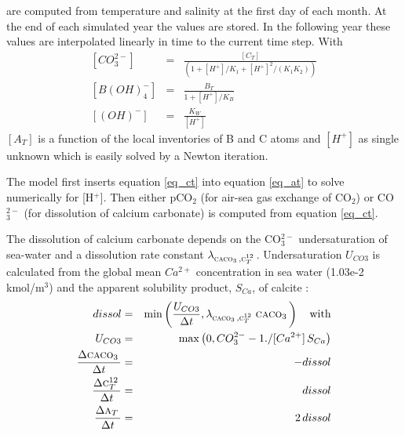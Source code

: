 \documentclass[11pt,a4paper,fleqn,twoside]{article}
\def\car{\text{\textsc{c$_T^{12}$}}\,}
\def\alk{\text{\textsc{a$_T$}}\,}
\def\cal{\text{\textsc{caco$_3$}}\,}
\begin{document}
are computed from temperature and salinity at the first day of  each
month. At the end of each simulated year the values are stored. In the
following year these values are interpolated linearly in time to the 
current time step. 
With
\begin{eqnarray}
\left[CO_3^{2-}\right]& = &\frac{\left[C_T\right]}{(1+\left[H^+\right]/K_1+\left[H^+\right]^2/(K_1K_2))} \\
\left[B(OH)_4^-\right]& = &\frac{B_T}{1+\left[H^+\right]/K_B} \\
\left[(OH)^-\right]& = &\frac{K_W}{\left[H^+\right]}
\end{eqnarray}
$[A_T]$ is a function of the local inventories of B and C atoms and $[H^+]$
as single unknown which is easily solved by a Newton iteration.

The model first inserts equation \ref{eq_ct} into equation \ref{eq_at} to solve
numerically for [H$^+$]. Then either pCO$_2$ (for air-sea gas exchange of
CO$_2$) or CO$_3^{2-}$ (for dissolution of calcium carbonate) is computed from
equation \ref{eq_ct}.

The dissolution of calcium carbonate depends on the CO$_3^{2-}$ undersaturation
of sea-water and a dissolution rate constant $\lambda_{\cal,\car}$.
Undersaturation $U_{CO3}$ is calculated from the global mean $Ca^{2+}$ concentration in sea water
(1.03e-2 kmol/m$^3$) and the apparent solubility product, $S_{Ca}$, of calcite :
\begin{eqnarray}
dissol & = & \min\left(\frac{U_{CO3}}{\Delta t},\lambda_{\cal,\car} \,\cal \right) \quad \mbox{with} \nonumber \\ 
U_{CO3} & = & \max\left(0, CO_3^{2-} - 1./[Ca^{2+}]\,S_{Ca}\right)  \nonumber \\ 
\frac{\Delta  \cal}{\Delta  t}& = &  - dissol\\
\frac{\Delta  \car}{\Delta  t}& = &  dissol\\
\frac{\Delta  \alk}{\Delta  t}& = &  2 \, dissol
\end{eqnarray}
\end{document}
